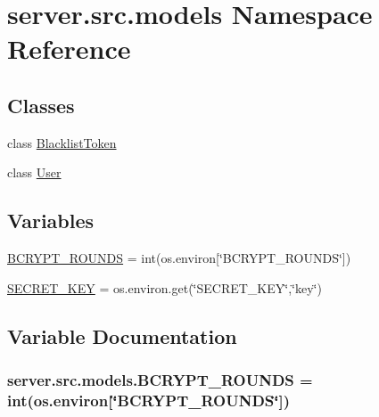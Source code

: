 \hypertarget{namespaceserver_1_1src_1_1models}{}\section{server.\+src.\+models Namespace Reference}
\label{namespaceserver_1_1src_1_1models}
\subsection*{Classes}
\begin{DoxyCompactItemize}
\item 
class \hyperlink{classserver_1_1src_1_1models_1_1_blacklist_token}{Blacklist\+Token}
\item 
class \hyperlink{classserver_1_1src_1_1models_1_1_user}{User}
\end{DoxyCompactItemize}
\subsection*{Variables}
\begin{DoxyCompactItemize}
\item 
\hyperlink{namespaceserver_1_1src_1_1models_a9878d21720977adc2231237ab3935f9f}{B\+C\+R\+Y\+P\+T\+\_\+\+R\+O\+U\+N\+DS} = int(os.\+environ\mbox{[}\char`\"{}B\+C\+R\+Y\+P\+T\+\_\+\+R\+O\+U\+N\+DS\char`\"{}\mbox{]})
\item 
\hyperlink{namespaceserver_1_1src_1_1models_aab444ae0b57d9be125bb8e6868a65c75}{S\+E\+C\+R\+E\+T\+\_\+\+K\+EY} = os.\+environ.\+get(\char`\"{}S\+E\+C\+R\+E\+T\+\_\+\+K\+EY\char`\"{},\char`\"{}key\char`\"{})
\end{DoxyCompactItemize}


\subsection{Variable Documentation}
\subsubsection[{\texorpdfstring{B\+C\+R\+Y\+P\+T\+\_\+\+R\+O\+U\+N\+DS}{BCRYPT_ROUNDS}}]{\setlength{\rightskip}{0pt plus 5cm}server.\+src.\+models.\+B\+C\+R\+Y\+P\+T\+\_\+\+R\+O\+U\+N\+DS = int(os.\+environ\mbox{[}\char`\"{}B\+C\+R\+Y\+P\+T\+\_\+\+R\+O\+U\+N\+DS\char`\"{}\mbox{]})}\hypertarget{namespaceserver_1_1src_1_1models_a9878d21720977adc2231237ab3935f9f}{}\label{namespaceserver_1_1src_1_1models_a9878d21720977adc2231237ab3935f9f}



